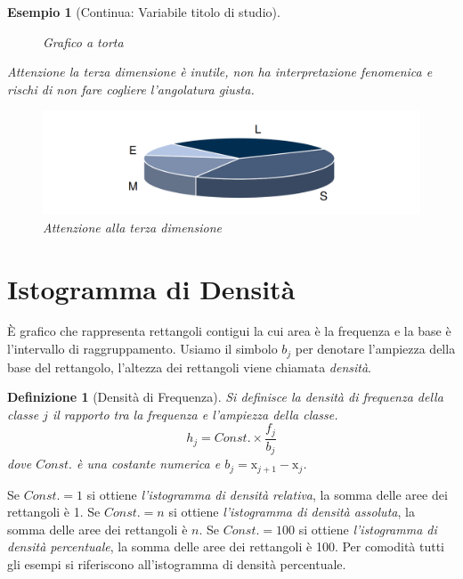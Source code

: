 \documentclass[
  11pt,
]{book}
\theoremstyle{mytheoremstyle}
\theoremstyle{mydefstyle}
\newtheorem{definition}{Definizione}[section]
\newtheorem{example}{{Esempio}}[section]
\newenvironment{att}
  {
\begin{tcolorbox}[enhanced,arc=0.1mm,boxrule=1pt,colback=white,colframe=ared,title=\bf\small \fontfamily{lmss}\selectfont \faExclamationTriangle \hspace{.5 cm} Attenzione,drop fuzzy shadow]
}{
\end{tcolorbox}
  }
\begin{document}
\begin{example}[Continua: Variabile titolo di studio]
\begin{figure}[H]
{}

\caption{Grafico a torta}\label{fig:unnamed-chunk-8}
\end{figure}

\begin{att}

Attenzione la terza dimensione è inutile, non ha interpretazione fenomenica e
rischi di non fare cogliere l'angolatura giusta.

\begin{figure}[H]

\includegraphics[width=18.31in,]{img/grafico_torta_3d_margin} \hfill{}

\caption{Attenzione alla terza dimensione}\label{fig:unnamed-chunk-9}
\end{figure}

\end{att}

\end{example}

\section{Istogramma di Densità}\label{istogramma-di-densituxe0}

È grafico che rappresenta rettangoli contigui la cui area è la frequenza e la base è l'intervallo di raggruppamento. Usiamo il simbolo \(b_j\) per denotare l'ampiezza della base del rettangolo, l'altezza dei rettangoli viene chiamata \emph{densità}.

\begin{info}

\begin{definition}[Densità di Frequenza]
Si definisce la \emph{densità di frequenza} della classe \(j\) il rapporto tra la frequenza e l'ampiezza della classe.
\[h_j = Const.\times \frac {f_j} {b_j}\]
dove \(Const.\) è una costante numerica e \(b_j=\text{x}_{j+1}-\text{x}_{j}\).
\end{definition}

\end{info}

Se \(Const.=1\) si ottiene \emph{l'istogramma di densità relativa}, la somma delle aree dei rettangoli è 1. Se \(Const.=n\) si ottiene \emph{l'istogramma di densità assoluta}, la somma delle aree dei rettangoli è \(n\). Se \(Const.=100\) si ottiene \emph{l'istogramma di densità percentuale}, la somma delle aree dei rettangoli è 100. Per comodità tutti gli esempi si riferiscono all'istogramma di densità percentuale.
\end{document}
